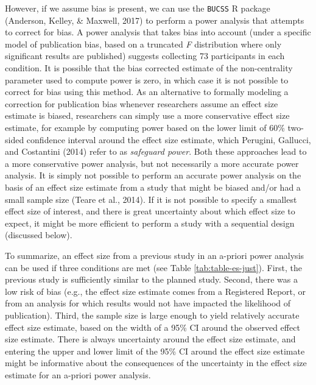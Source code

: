 \documentclass[
  english,
  ,jou, a4paper,floatsintext]{apa6}
\begin{document}
However, if we assume bias is present, we can use the \texttt{BUCSS} R package (Anderson, Kelley, \& Maxwell, 2017) to perform a power analysis that attempts to correct for bias. A power analysis that takes bias into account (under a specific model of publication bias, based on a truncated \emph{F} distribution where only significant results are published) suggests collecting 73 participants in each condition. It is possible that the bias corrected estimate of the non-centrality parameter used to compute power is zero, in which case it is not possible to correct for bias using this method. As an alternative to formally modeling a correction for publication bias whenever researchers assume an effect size estimate is biased, researchers can simply use a more conservative effect size estimate, for example by computing power based on the lower limit of 60\% two-sided confidence interval around the effect size estimate, which Perugini, Gallucci, and Costantini (2014) refer to as \emph{safeguard power}. Both these approaches lead to a more conservative power analysis, but not necessarily a more accurate power analysis. It is simply not possible to perform an accurate power analysis on the basis of an effect size estimate from a study that might be biased and/or had a small sample size (Teare et al., 2014). If it is not possible to specify a smallest effect size of interest, and there is great uncertainty about which effect size to expect, it might be more efficient to perform a study with a sequential design (discussed below).

To summarize, an effect size from a previous study in an a-priori power analysis can be used if three conditions are met (see Table \ref{tab:table-es-just}). First, the previous study is sufficiently similar to the planned study. Second, there was a low risk of bias (e.g., the effect size estimate comes from a Registered Report, or from an analysis for which results would not have impacted the likelihood of publication). Third, the sample size is large enough to yield relatively accurate effect size estimate, based on the width of a 95\% CI around the observed effect size estimate. There is always uncertainty around the effect size estimate, and entering the upper and lower limit of the 95\% CI around the effect size estimate might be informative about the consequences of the uncertainty in the effect size estimate for an a-priori power analysis.
\end{document}
